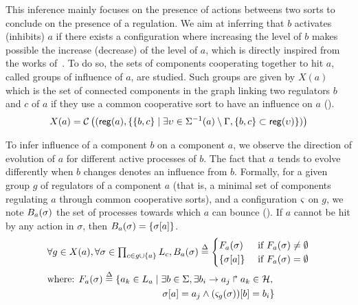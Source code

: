 This inference mainly focuses on the presence of actions betweens two sorts to conclude on the presence of a regulation.
We aim at inferring that $b$ activates (inhibits) $a$ if there exists a configuration where increasing
the level of $b$ makes possible the increase (decrease) of the level of $a$,
which is directly inspired from the works of~\cite{Richard2010378}.
To do so, the sets of components cooperating together to hit $a$, called groups of influence of $a$, are studied.
Such groups are given by $X(a)$ which is the set of connected components in the graph linking two regulators
$b$ and $c$ of $a$ if they use a common cooperative sort to have an influence on $a$ ().
\begin{equation}
X(a) = \mathcal C\left( (\mathsf{reg}({a}), \{ \{b,c\} \mid
        \exists \upsilon\in \Sigma^{-1}(a) \setminus \Gamma,
        \{b,c\} \subset \mathsf{reg}({\upsilon}) \}) \right)
\label{eq:influence-groups}
\end{equation}

To infer influence of a component $b$ on a component $a$,
we observe the direction of evolution of $a$ for different active processes of $b$.
The fact that $a$ tends to evolve differently when $b$ changes denotes an influence from $b$.
Formally, for a given group $g$ of regulators of a component $a$
(that is, a minimal set of components regulating $a$ through common cooperative sorts),
and a configuration $\varsigma$ on $g$, we note
$B_a(\sigma)$ the set of processes towards which $a$ can bounce ().
If $a$ cannot be hit by any action in $\sigma$, then $B_a(\sigma) = \{ {\sigma[a]} \}$.
%
\begin{align}
\begin{split}\label{eq:possible-bounces}
  &\forall g \in X(a), \forall \sigma \in \textstyle\prod_{c\in g \cup \{ a \}} L_c,
  B_a(\sigma) \stackrel{\Delta}= 
  \begin{cases}
    F_a(\sigma)
      & \text{ if } F_a(\sigma) \neq \emptyset\\
    \{ {\sigma[a]} \}
      & \text{ if } F_a(\sigma) = \emptyset
  \end{cases}\\
  &\text{where: } F_a(\sigma) \stackrel{\Delta}= \{ a_k \in L_a \mid \exists b \in \Sigma, \exists b_i\rightarrow a_j\Rsh a_k \in \mathcal{H},\\
  & \qquad\qquad\qquad\qquad\qquad\qquad {\sigma[a]} = a_j \wedge {(\varsigma_{g}(\sigma))[b]} = b_i \}\\
\end{split}
\end{align}

